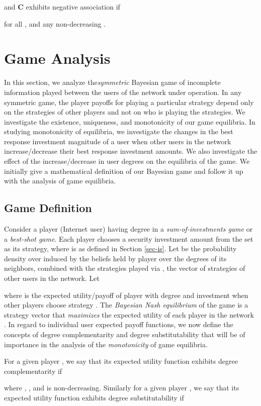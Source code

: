 \documentclass[letterpaper,12pt,onecolumn, nodraft]{IEEEtran}
\begin{document}
and \textbf{C} exhibits negative association if  

for  all , and any non-decreasing .
\section{Game Analysis}
In this section, we analyze the\emph{symmetric} Bayesian game of incomplete information played between the users of the network under operation. In any symmetric game, the player payoffs for playing a particular strategy depend only on the strategies of other players and not on who is playing the strategies. We investigate the existence, uniqueness, and monotonicity of our game equilibria. In studying monotonicity of equilibria, we investigate the changes in the best response investment magnitude of a user when other users in the network increase/decrease their best response investment amounts. We also investigate the effect of the increase/decrease in user degrees on the equilibria of the game. We initially give a mathematical definition of our Bayesian game and follow it up with the analysis of game equilibria. 

\subsection{Game Definition}
Consider a player (Internet user)  having degree  in a \emph{sum-of-investments game} or a \emph{best-shot game}. Each player chooses a security investment amount from the set  as its strategy, where  is as defined in Section \ref{sec-is}. Let  be the probability density over  induced by the beliefs  held by player  over the degrees of its neighbors, combined with the strategies played via , the vector of strategies of other users in the network. Let 

where  is the expected utility/payoff of player  with degree  and investment  when other players choose strategy . The \emph{Bayesian Nash equilibrium} of the game is a strategy vector that \emph{maximizes} the expected utility of each player in the network \cite{ft}\cite{or}.  In regard to individual user expected payoff functions, we now define the concepts of degree complementarity and degree substitutability that will be of importance in the analysis of the \emph{monotonicity} of game equilibria. 

For a given player , we say that its expected utility function exhibits degree complementarity if 

where , , and  is non-decreasing. Similarly for a given player , we say that its expected utility function exhibits degree substitutability if 
\end{document}
